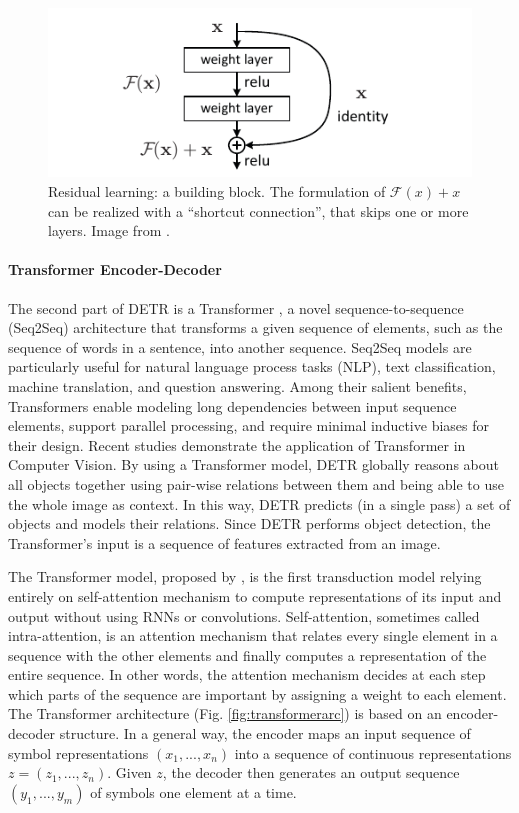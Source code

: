 \begin{figure}[h!]
	\centering
	\includegraphics[width=\linewidth]{images/residualblock.pdf}
	\caption{Residual learning: a building block. The formulation of $\mathcal{F}(x)+x$ can be realized with a ``shortcut connection'', that skips one or more layers. Image from \cite{resnet}.}
	\label{fig:resblock}
\end{figure}

\paragraph{Transformer Encoder-Decoder} The second part of DETR is a Transformer \cite{transformer}, a novel sequence-to-sequence (Seq2Seq) architecture that transforms a given sequence of elements, such as the sequence of words in a sentence, into another sequence. Seq2Seq models are particularly useful for natural language process tasks (NLP), text classification, machine translation, and
question answering. Among their salient benefits, Transformers enable modeling long dependencies between input sequence elements, support parallel processing, and require minimal inductive biases for their design. Recent studies \cite{surveytransformer} demonstrate the application of Transformer in Computer Vision. By using a Transformer model, DETR globally reasons about all objects together using pair-wise relations between them and being able to use the whole image as context. In this way, DETR predicts (in a single pass) a set of objects and
models their relations. Since DETR performs object detection, the Transformer's input is a sequence of features extracted from an image.

The Transformer model, proposed by \citeauthor{transformer} \cite{transformer}, is the first transduction model relying entirely on self-attention mechanism to compute representations of its input and output without using RNNs or convolutions. Self-attention, sometimes called intra-attention, is an attention mechanism that relates every single element in a sequence with the other elements and finally computes a representation of the entire sequence. In other words, the attention mechanism decides at each step which parts of the sequence are important by assigning a weight to each element. The Transformer architecture (Fig. \ref{fig:transformerarc}) is based on an encoder-decoder structure. In a general way, the encoder maps an input sequence of symbol representations $(x_1, ..., x_n)$ into a sequence of continuous representations $z = (z_1, ..., z_n)$. Given $z$, the decoder then generates an output sequence $(y_1, ..., y_m)$ of symbols one element at a time.

